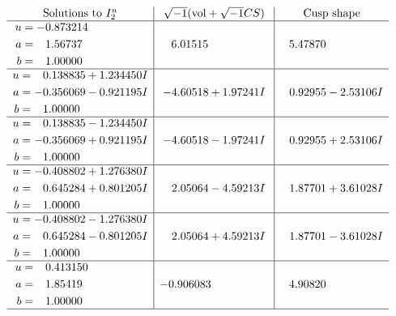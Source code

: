 \documentclass[1p]{elsarticle_modified}
\theoremstyle{definition}
\newcommand{\I}{\sqrt{-1}}
\begin{document}
$$\begin{array}{c|c|c}  
\text{Solutions to }I^u_{2}& \I (\text{vol} + \sqrt{-1}CS) & \text{Cusp shape}\\
 \hline 
\begin{aligned}
u &= -0.873214\phantom{ +0.000000I} \\
a &= \phantom{-}1.56737\phantom{ +0.000000I} \\
b &= \phantom{-}1.00000\phantom{ +0.000000I}\end{aligned}
 & \phantom{-}6.01515\phantom{ +0.000000I} & \phantom{-}5.47870\phantom{ +0.000000I} \\ \hline\begin{aligned}
u &= \phantom{-}0.138835 + 1.234450 I \\
a &= -0.356069 - 0.921195 I \\
b &= \phantom{-}1.00000\phantom{ +0.000000I}\end{aligned}
 & -4.60518 + 1.97241 I & \phantom{-}0.92955 - 2.53106 I \\ \hline\begin{aligned}
u &= \phantom{-}0.138835 - 1.234450 I \\
a &= -0.356069 + 0.921195 I \\
b &= \phantom{-}1.00000\phantom{ +0.000000I}\end{aligned}
 & -4.60518 - 1.97241 I & \phantom{-}0.92955 + 2.53106 I \\ \hline\begin{aligned}
u &= -0.408802 + 1.276380 I \\
a &= \phantom{-}0.645284 + 0.801205 I \\
b &= \phantom{-}1.00000\phantom{ +0.000000I}\end{aligned}
 & \phantom{-}2.05064 - 4.59213 I & \phantom{-}1.87701 + 3.61028 I \\ \hline\begin{aligned}
u &= -0.408802 - 1.276380 I \\
a &= \phantom{-}0.645284 - 0.801205 I \\
b &= \phantom{-}1.00000\phantom{ +0.000000I}\end{aligned}
 & \phantom{-}2.05064 + 4.59213 I & \phantom{-}1.87701 - 3.61028 I \\ \hline\begin{aligned}
u &= \phantom{-}0.413150\phantom{ +0.000000I} \\
a &= \phantom{-}1.85419\phantom{ +0.000000I} \\
b &= \phantom{-}1.00000\phantom{ +0.000000I}\end{aligned}
 & -0.906083\phantom{ +0.000000I} & \phantom{-}4.90820\phantom{ +0.000000I}\\
 \hline 
 \end{array}$$\newpage
\end{document}
